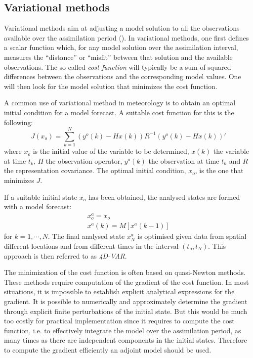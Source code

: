 \subsection{Variational methods}\label{sec:variational_methods}
Variational methods aim at adjusting a model solution to all the observations
available over the assimilation period (\cite{Talagrand1997}). In variational
methods, one first defines a scalar function which, for any model solution over
the assimilation interval, measures the ``distance'' or ``misfit'' between that
solution and the available observations. The so-called \emph{cost function}
will typically be a sum of squared differences between the observations and the
corresponding model values. One will then look for the model solution that
minimizes the cost function.

A common use of variational method in meteorology is to obtain an optimal
initial condition for a model forecast. A suitable cost function for this is
the following:
\begin{equation}\label{eq.costfunction1}
J(x_o) = \sum_{k=1}^N (y^o(k)-Hx(k))R^{-1}(y^o(k)-Hx(k))'
\end{equation}
where $x_o$ is the initial value of the variable to be determined, $x(k)$ the
variable at time $t_k$, $H$ the observation operator, $y^o(k)$ the observation
at time $t_k$ and $R$ the representation covariance. The optimal initial
condition, $x_o$, is the one that minimizes $J$.

If a suitable initial state $x_o$ has been obtained, the analysed states are
formed with a model forecast:
\begin{eqnarray}
x^a_o = x_o \\
x^a(k) = M[x^a(k-1)]
\end{eqnarray}
for $k=1, \cdots, N$. The final analysed state $x^a_N$ is optimised given data
from spatial different locations and from different times in the interval
$(t_o,t_N)$. This approach is then referred to as \emph{4D-VAR}.

The minimization of the cost function is often based on quasi-Newton methods.
These methods require computation of the gradient of the cost function. In most
situations, it is impossible to establish explicit analytical expressions for
the gradient. It is possible to numerically and approximately determine the
gradient through explicit finite perturbations of the initial state. But this
would be much too costly for practical implementation since it requires to
compute the cost function, i.e. to effectively integrate the model over the
assimilation period, as many times as there are independent components in the
initial states. Therefore to compute the gradient efficiently an adjoint model
should be used.

